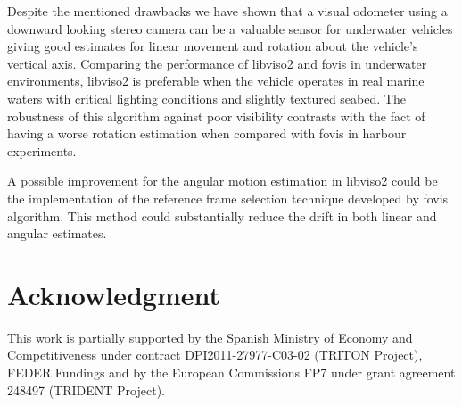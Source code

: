 \documentclass[conference]{IEEEtran}
\begin{document}
Despite the mentioned drawbacks we have shown that a visual odometer using a downward looking stereo camera can be a valuable sensor for underwater vehicles giving good estimates for linear movement and rotation about the vehicle's vertical axis. Comparing the performance of libviso2 and fovis in underwater environments, libviso2 is preferable when the vehicle operates in real marine waters with critical lighting conditions and slightly textured seabed. The robustness of this algorithm against poor visibility contrasts with the fact of having a worse rotation estimation when compared with fovis in harbour experiments.

A possible improvement for the angular motion estimation in libviso2 could be the implementation of the reference frame selection technique developed by fovis algorithm. This method could substantially reduce the drift in both linear and angular estimates.

\section{Acknowledgment
  \label{acknowledgment}
}

This work is partially supported by the Spanish Ministry of Economy and Competitiveness under contract DPI2011-27977-C03-02 (TRITON Project), FEDER Fundings and by the European Commissions FP7 under grant agreement 248497 (TRIDENT Project).




\end{document}
